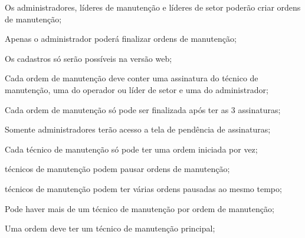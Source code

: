 \begin{subalineas}
	\item {Os administradores, líderes de manutenção e líderes de setor poderão criar ordens de manutenção};
	\item {Apenas o administrador poderá finalizar ordens de manutenção};
	\item {Os cadastros só serão possíveis na versão web};
	\item {Cada ordem de manutenção deve conter uma assinatura do técnico de manutenção, uma do operador ou líder de setor e uma do administrador};
	\item {Cada ordem de manutenção só pode ser finalizada após ter as 3 assinaturas};
	\item {Somente administradores terão acesso a tela de pendência de assinaturas};
	\item {Cada técnico de manutenção só pode ter uma ordem iniciada por vez};
	\item {técnicos de manutenção podem pausar ordens de manutenção};
	\item {técnicos de manutenção podem ter várias ordens pausadas ao mesmo tempo};
	\item {Pode haver mais de um técnico de manutenção por ordem de manutenção};
	\item {Uma ordem deve ter um técnico de manutenção principal};
\end{subalineas}




